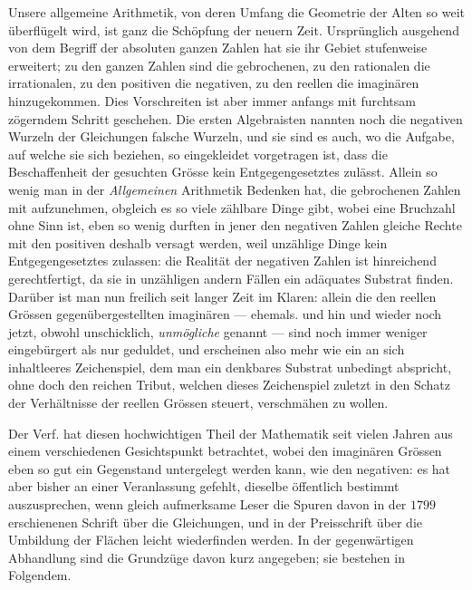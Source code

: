 Unsere allgemeine Arithmetik, von deren Umfang die Geometrie der Alten so weit überflügelt wird, ist ganz die Schöpfung der neuern Zeit. Ursprünglich ausgehend von dem Begriff der absoluten ganzen Zahlen hat sie ihr Gebiet stufenweise erweitert; zu den ganzen Zahlen sind die gebrochenen, zu den rationalen die irrationalen, zu den positiven die negativen, zu den reellen die imaginären hinzugekommen. Dies Vorschreiten ist aber immer anfangs mit furchtsam zögerndem Schritt geschehen. Die ersten Algebraisten nannten noch die negativen Wurzeln der Gleichungen falsche Wurzeln, und sie sind es auch, wo die Aufgabe, auf welche sie sich beziehen, so eingekleidet vorgetragen ist, dass die Beschaffenheit der gesuchten Grösse kein Entgegengesetztes zulässt. Allein so wenig man in der \emph{Allgemeinen} Arithmetik Bedenken hat, die gebrochenen Zahlen mit aufzunehmen, obgleich es so viele zählbare Dinge gibt, wobei eine Bruchzahl ohne Sinn ist, eben so wenig durften in jener den negativen Zahlen gleiche Rechte mit den positiven deshalb versagt werden, weil unzählige Dinge kein Entgegengesetztes zulassen: die Realität der negativen Zahlen ist hinreichend gerechtfertigt, da sie in unzähligen andern Fällen ein adäquates Substrat finden. Darüber ist man nun freilich seit langer Zeit im Klaren: allein die den reellen Grössen gegenübergestellten imaginären --- ehemals. und hin und wieder noch jetzt, obwohl unschicklich, \emph{unmögliche} genannt --- sind noch immer weniger eingebürgert als nur geduldet, und erscheinen also mehr wie ein an sich inhaltleeres Zeichenspiel, dem man ein denkbares Substrat unbedingt abspricht, ohne doch den reichen Tribut, welchen dieses Zeichenspiel zuletzt in den Schatz der Verhältnisse der reellen Grössen steuert, verschmähen zu wollen.

Der Verf. hat diesen hochwichtigen Theil der Mathematik seit vielen Jahren aus einem verschiedenen Gesichtspunkt betrachtet, wobei den imaginären Grössen eben so gut ein Gegenstand untergelegt werden kann, wie den negativen: es hat aber bisher an einer Veranlassung gefehlt, dieselbe öffentlich bestimmt auszusprechen, wenn gleich aufmerksame Leser die Spuren davon in der $1799$ erschienenen Schrift über die Gleichungen, und in der Preisschrift über die Umbildung der Flächen leicht wiederfinden werden. In der gegenwärtigen Abhandlung sind die Grundzüge davon kurz angegeben; sie bestehen in Folgendem.

